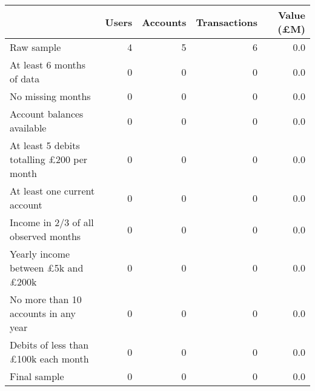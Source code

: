 \begin{tabular}{lrrrr}
\toprule
                                                 & Users & Accounts & Transactions & Value (\pounds M) \\
\midrule
                                      Raw sample &     4 &        5 &            6 &               0.0 \\
                       At least 6 months of data &     0 &        0 &            0 &               0.0 \\
                               No missing months &     0 &        0 &            0 &               0.0 \\
                      Account balances available &     0 &        0 &            0 &               0.0 \\
At least 5 debits totalling \pounds200 per month &     0 &        0 &            0 &               0.0 \\
                    At least one current account &     0 &        0 &            0 &               0.0 \\
            Income in 2/3 of all observed months &     0 &        0 &            0 &               0.0 \\
 Yearly income between \pounds5k and \pounds200k &     0 &        0 &            0 &               0.0 \\
            No more than 10 accounts in any year &     0 &        0 &            0 &               0.0 \\
      Debits of less than \pounds100k each month &     0 &        0 &            0 &               0.0 \\
                                    Final sample &     0 &        0 &            0 &               0.0 \\
\bottomrule
\end{tabular}
